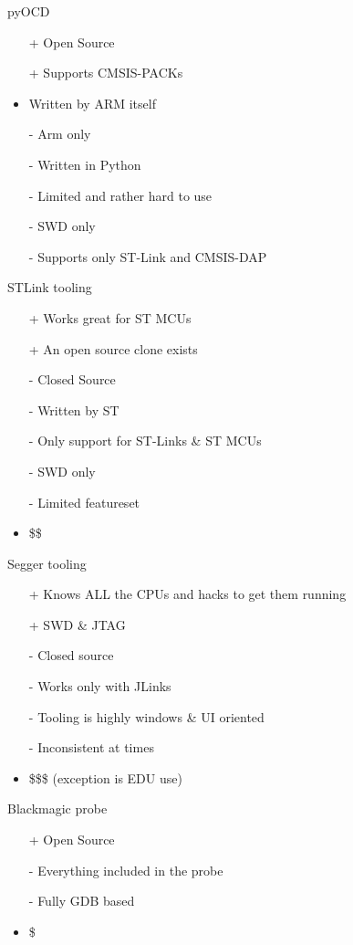 \documentclass[aspectratio=1610,14pt,t]{beamer}
\begin{document}
\begin{frame}[c]{pyOCD}
  \begin{itemize}
    \item[+] Open Source
    \item[+] Supports CMSIS-PACKs
    \item Written by ARM itself
    \item[-] Arm only
    \item[-] Written in Python
    \item[-] Limited and rather hard to use
    \item[-] SWD only
    \item[-] Supports only ST-Link and CMSIS-DAP
  \end{itemize}
\end{frame}

\begin{frame}[c]{STLink tooling}
  \begin{itemize}
    \item[+] Works great for ST MCUs
    \item[+] An open source clone exists
    \item[-] Closed Source
    \item[-] Written by ST
    \item[-] Only support for ST-Links \& ST MCUs
    \item[-] SWD only
    \item[-] Limited featureset
    \item \$\$
  \end{itemize}
\end{frame}

\begin{frame}[c]{Segger tooling}
  \begin{itemize}
    \item[+] Knows ALL the CPUs and hacks to get them running
    \item[+] SWD \& JTAG
    \item[-] Closed source
    \item[-] Works only with JLinks
    \item[-] Tooling is highly windows \& UI oriented
    \item[-] Inconsistent at times
    \item \$\$\$ (exception is EDU use)
  \end{itemize}
\end{frame}

\begin{frame}[c]{Blackmagic probe}
  \begin{itemize}
    \item[+] Open Source
    \item[-] Everything included in the probe
    \item[-] Fully GDB based
    \item \$
  \end{itemize}
\end{frame}
\end{document}
